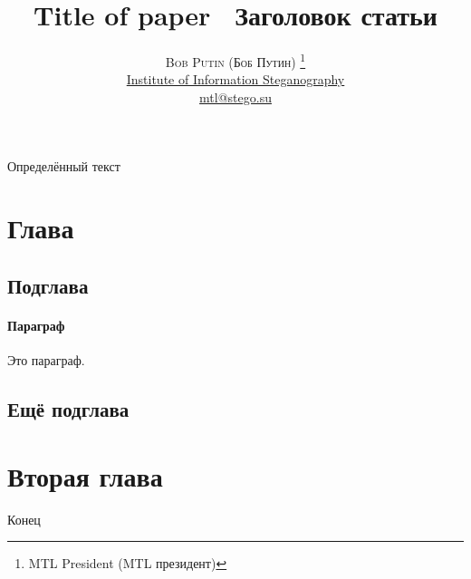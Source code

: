 \documentclass[twoside]{article}
\title{\vspace{-15mm}\fontsize{24pt}{10pt}\selectfont\textbf{
        Title of paper \ Заголовок статьи
    }} %
\author{
        \large
        \textsc{ Bob Putin (Боб Путин) }\thanks{MTL President (MTL президент)}\\[2mm] %
        \normalsize \href{ iis.stego.su  }{ Institute of Information Steganography } \\ %
        \normalsize \href{mailto: mtl@stego.su }{mtl@stego.su} %
        \vspace{-5mm}
    }
\date{}
\begin{document}
\maketitle

Определённый текст

\section{Глава}

\subsection{Подглава}

\paragraph{Параграф}
Это параграф.


\subsection{Ещё подглава}

\section{Вторая глава}

Конец
\end{document}
